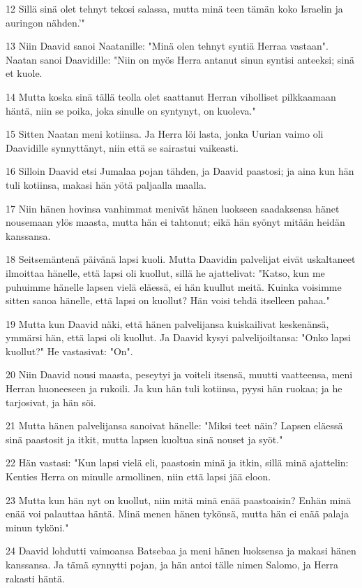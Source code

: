 \par 12 Sillä sinä olet tehnyt tekosi salassa, mutta minä teen tämän koko Israelin ja auringon nähden.'"
\par 13 Niin Daavid sanoi Naatanille: "Minä olen tehnyt syntiä Herraa vastaan". Naatan sanoi Daavidille: "Niin on myös Herra antanut sinun syntisi anteeksi; sinä et kuole.
\par 14 Mutta koska sinä tällä teolla olet saattanut Herran viholliset pilkkaamaan häntä, niin se poika, joka sinulle on syntynyt, on kuoleva."
\par 15 Sitten Naatan meni kotiinsa. Ja Herra löi lasta, jonka Uurian vaimo oli Daavidille synnyttänyt, niin että se sairastui vaikeasti.
\par 16 Silloin Daavid etsi Jumalaa pojan tähden, ja Daavid paastosi; ja aina kun hän tuli kotiinsa, makasi hän yötä paljaalla maalla.
\par 17 Niin hänen hovinsa vanhimmat menivät hänen luokseen saadaksensa hänet nousemaan ylös maasta, mutta hän ei tahtonut; eikä hän syönyt mitään heidän kanssansa.
\par 18 Seitsemäntenä päivänä lapsi kuoli. Mutta Daavidin palvelijat eivät uskaltaneet ilmoittaa hänelle, että lapsi oli kuollut, sillä he ajattelivat: "Katso, kun me puhuimme hänelle lapsen vielä eläessä, ei hän kuullut meitä. Kuinka voisimme sitten sanoa hänelle, että lapsi on kuollut? Hän voisi tehdä itselleen pahaa."
\par 19 Mutta kun Daavid näki, että hänen palvelijansa kuiskailivat keskenänsä, ymmärsi hän, että lapsi oli kuollut. Ja Daavid kysyi palvelijoiltansa: "Onko lapsi kuollut?" He vastasivat: "On".
\par 20 Niin Daavid nousi maasta, peseytyi ja voiteli itsensä, muutti vaatteensa, meni Herran huoneeseen ja rukoili. Ja kun hän tuli kotiinsa, pyysi hän ruokaa; ja he tarjosivat, ja hän söi.
\par 21 Mutta hänen palvelijansa sanoivat hänelle: "Miksi teet näin? Lapsen eläessä sinä paastosit ja itkit, mutta lapsen kuoltua sinä nouset ja syöt."
\par 22 Hän vastasi: "Kun lapsi vielä eli, paastosin minä ja itkin, sillä minä ajattelin: Kenties Herra on minulle armollinen, niin että lapsi jää eloon.
\par 23 Mutta kun hän nyt on kuollut, niin mitä minä enää paastoaisin? Enhän minä enää voi palauttaa häntä. Minä menen hänen tykönsä, mutta hän ei enää palaja minun tyköni."
\par 24 Daavid lohdutti vaimoansa Batsebaa ja meni hänen luoksensa ja makasi hänen kanssansa. Ja tämä synnytti pojan, ja hän antoi tälle nimen Salomo, ja Herra rakasti häntä.
